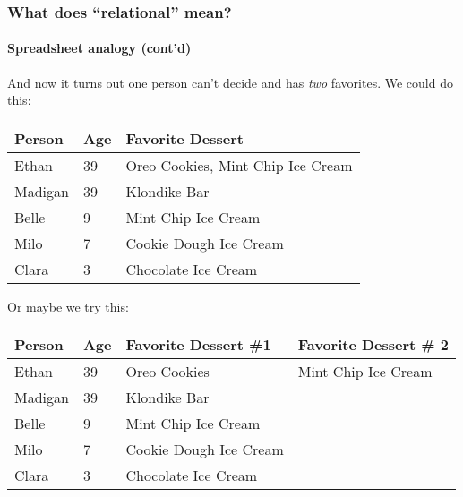 \documentclass{beamer}
\begin{document}
\begin{frame}
  \frametitle{What does ``relational'' mean?}
  \framesubtitle{Spreadsheet analogy (cont'd)}

  And now it turns out one person can't decide and has \emph{two} favorites.
  We could do this:

  \begin{table}[]
    \small
    \begin{tabular}{@{}lll@{}}
      \toprule
      Person  & Age & Favorite Dessert                  \\ \midrule
      Ethan   & 39  & Oreo Cookies, Mint Chip Ice Cream \\
      Madigan & 39  & Klondike Bar                      \\
      Belle   & 9   & Mint Chip Ice Cream               \\
      Milo    & 7   & Cookie Dough Ice Cream            \\
      Clara   & 3   & Chocolate Ice Cream               \\ \bottomrule
    \end{tabular}
  \end{table}

  Or maybe we try this:

  \begin{table}[]
    \small
    \begin{tabular}{@{}llll@{}}
      \toprule
      Person  & Age & Favorite Dessert \#1   & Favorite Dessert \# 2 \\ \midrule
      Ethan   & 39  & Oreo Cookies           & Mint Chip Ice Cream   \\
      Madigan & 39  & Klondike Bar           &                       \\
      Belle   & 9   & Mint Chip Ice Cream    &                       \\
      Milo    & 7   & Cookie Dough Ice Cream &                       \\
      Clara   & 3   & Chocolate Ice Cream    &                       \\ \bottomrule
    \end{tabular}
  \end{table}
\end{frame}
\end{document}
